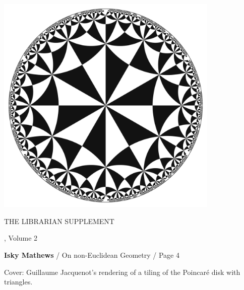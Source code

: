%
%
%

\pagestyle{empty}

\null
\vspace{\fill}

\begin{center}
	\includegraphics[width=0.8\textwidth]{cover.png}
\end{center}

\null
\vspace{\fill}

\begin{center}

{\fontsize{32}{48}\selectfont
{THE LIBRARIAN SUPPLEMENT}}
\vspace{1.2em}

, Volume 2

\vspace{1.2em}

\Large

\textbf{Isky Mathews} / On non-Euclidean Geometry / Page 4

\normalsize

\vspace{1.2em}

Cover: Guillaume Jacquenot's rendering of a tiling of the Poincaré disk with triangles.

\end{center}

%